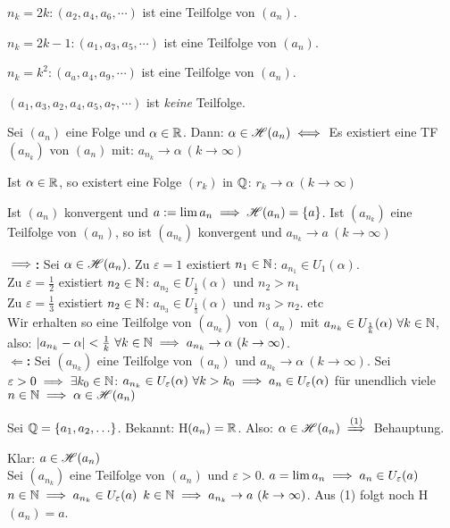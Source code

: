 \documentclass[a4paper,twoside,DIV15,BCOR12mm]{scrbook}
\begin{document}
\begin{beispiele}
\item $n_k=2k: (a_2, a_4, a_6, \cdots)$ ist eine Teilfolge von $(a_n)$.
\item $n_k=2k-1: (a_1, a_3, a_5, \cdots)$ ist eine Teilfolge von $(a_n)$.
\item $n_k=k^2: (a_a, a_4, a_9, \cdots)$ ist eine Teilfolge von $(a_n)$.
\item $(a_1, a_3, a_2, a_4, a_5, a_7, \cdots)$ ist \emph{keine} Teilfolge.
\end{beispiele}

\begin{satz}
\begin{liste}
\item Sei $(a_n)$ eine Folge und $\alpha \in\mathbb{R}$. Dann: $\alpha \in \mathscr{H}(a_n) \iff$ Es existiert eine TF $(a_{n_k})$ von $(a_n)$ mit: $a_{n_k} \to \alpha\ (k \to \infty)$
\item Ist $\alpha \in \mathbb{R}$, so existert eine Folge $(r_k)$ in $\mathbb{Q}$: $r_k \to \alpha \ (k\to\infty)$
\item Ist $(a_n)$ konvergent und $a:=\lim a_n \implies \mathscr{H}(a_n) = \{a\}$. Ist $(a_{n_k})$ eine Teilfolge von $(a_n)$, so ist $(a_{n_k})$ konvergent und $a_{n_k} \to a\ (k \to \infty)$
\end{liste}
\end{satz}

\begin{beweise}
\item \textbf{\glqq$\implies$\grqq:} Sei $\alpha\in \mathscr{H}(a_n)$. Zu $\varepsilon = 1$ existiert $n_1\in\mathbb{N}$: $a_{n_1}\in U_1(\alpha)$. \\
Zu $\varepsilon =\frac{1}{2}$ existiert $n_2\in\mathbb{N}$: $a_{n_2} \in U_{\frac{1}{2}}(\alpha)$ und $n_2>n_1$ \\
Zu $\varepsilon =\frac{1}{3}$ existiert $n_2\in\mathbb{N}$: $a_{n_3} \in U_{\frac{1}{3}}(\alpha)$ und $n_3>n_2$. etc \\
Wir erhalten so eine Teilfolge von $(a_{n_k})$ von $(a_n)$ mit $a_{n_k} \in U_{\frac{1}{k}}(\alpha) \ \forall k\in\MdN$, also: $|a_{n_k} - \alpha| < \frac{1}{k} \ \forall k\in\MdN \folgt a_{n_k} \to \alpha \ (k\to\infty)$. \\
\textbf{\glqq$\Leftarrow$\grqq:} Sei $(a_{n_k})$ eine Teilfolge von $(a_n)$ und  $a_{n_k} \to \alpha\ (k\to\infty)$. Sei $\varepsilon > 0 \implies \exists k_0 \in\mathbb{N}$: $a_{n_k} \in U_\varepsilon(\alpha) \ \forall k>k_0 \implies a_n \in U_\varepsilon(\alpha)$ für unendlich viele $n\in\mathbb{N} \implies \alpha \in \mathscr{H}(a_n)$
\item Sei $\mathbb{Q} = \{a_1, a_2, \ldots\}$. Bekannt: H$(a_n) = \mathbb{R}$. Also: $\alpha \in \H(a_n) \folgtnach{(1)}$ Behauptung.
\item Klar: $a \in \mathscr{H}(a_n)$\\
Sei $(a_{n_k})$ eine Teilfolge von $(a_n)$ und $\varepsilon > 0 $. $a = \lim a_n \implies a_n \in U_\varepsilon(a)$ \ffa $n\in\mathbb{N} \implies a_{n_k} \in U_\varepsilon(a)$ \ffa $k\in\mathbb{N} \implies a_{n_k} \to a\ (k\to\infty)$. Aus (1) folgt noch H$(a_n) = {a}$.
\end{beweise}
\end{document}
